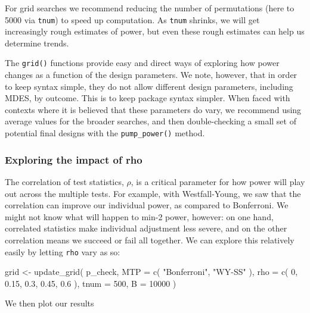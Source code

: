 \documentclass[
]{article}
\newenvironment{Shaded}{\begin{snugshade}}{\end{snugshade}}
\newcommand{\AttributeTok}[1]{\textcolor[rgb]{0.77,0.63,0.00}{#1}}
\newcommand{\DecValTok}[1]{\textcolor[rgb]{0.00,0.00,0.81}{#1}}
\newcommand{\FloatTok}[1]{\textcolor[rgb]{0.00,0.00,0.81}{#1}}
\newcommand{\FunctionTok}[1]{\textcolor[rgb]{0.00,0.00,0.00}{#1}}
\newcommand{\NormalTok}[1]{#1}
\newcommand{\OtherTok}[1]{\textcolor[rgb]{0.56,0.35,0.01}{#1}}
\newcommand{\StringTok}[1]{\textcolor[rgb]{0.31,0.60,0.02}{#1}}
\begin{document}
For grid searches we recommend reducing the number of permutations (here
to 5000 via \texttt{tnum}) to speed up computation. As \texttt{tnum}
shrinks, we will get increasingly rough estimates of power, but even
these rough estimates can help us determine trends.

The \texttt{grid()} functions provide easy and direct ways of exploring
how power changes as a function of the design parameters. We note,
however, that in order to keep syntax simple, they do not allow
different design parameters, including MDES, by outcome. This is to keep
package syntax simpler. When faced with contexts where it is believed
that these parameters do vary, we recommend using average values for the
broader searches, and then double-checking a small set of potential
final designs with the \texttt{pump\_power()} method.

\subsubsection{Exploring the impact of rho}

The correlation of test statistics, \(\rho\), is a critical parameter
for how power will play out across the multiple tests. For example, with
Westfall-Young, we saw that the correlation can improve our individual
power, as compared to Bonferroni. We might not know what will happen to
min-2 power, however: on one hand, correlated statistics make individual
adjustment less severe, and on the other correlation means we succeed or
fail all together. We can explore this relatively easily by letting
\texttt{rho} vary as so:

\begin{Shaded}
\begin{Highlighting}[]
\NormalTok{grid }\OtherTok{\textless{}{-}} \FunctionTok{update\_grid}\NormalTok{( p\_check,}
            \AttributeTok{MTP =} \FunctionTok{c}\NormalTok{( }\StringTok{"Bonferroni"}\NormalTok{, }\StringTok{"WY{-}SS"}\NormalTok{ ),}
            \AttributeTok{rho =} \FunctionTok{c}\NormalTok{( }\DecValTok{0}\NormalTok{, }\FloatTok{0.15}\NormalTok{, }\FloatTok{0.3}\NormalTok{, }\FloatTok{0.45}\NormalTok{, }\FloatTok{0.6}\NormalTok{ ),}
            \AttributeTok{tnum =} \DecValTok{500}\NormalTok{,}
            \AttributeTok{B =} \DecValTok{10000}\NormalTok{ )}
\end{Highlighting}
\end{Shaded}

We then plot our results
\end{document}
